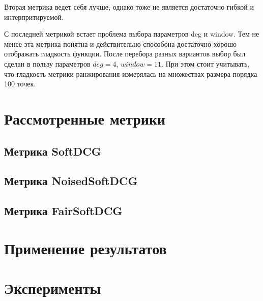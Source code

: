 \documentclass[12pt,a4paper]{amsart}
\theoremstyle{definition}
\theoremstyle{definition}
\begin{document}
Вторая метрика ведет себя лучше, однако тоже не является достаточно гибкой и интерпритируемой.

С последней метрикой встает проблема выбора параметров deg и window. Тем не менее эта метрика понятна и действительно способона достаточно хорошо отображать гладкость функции. После перебора разных вариантов выбор был сделан в пользу параметров ${deg = 4}$, ${window = 11}$. При этом стоит учитывать, что гладкость метрики ранжирования измерялась на множествах размера порядка 100 точек.


\newpage
\section{Рассмотренные метрики}

\subsection{Метрика SoftDCG}
\pagebreak


\subsection{Метрика NoisedSoftDCG}
\pagebreak


\subsection{Метрика FairSoftDCG}
\pagebreak


\newpage
\section{Применение результатов}


\newpage
\section{Эксперименты}
\end{document}
